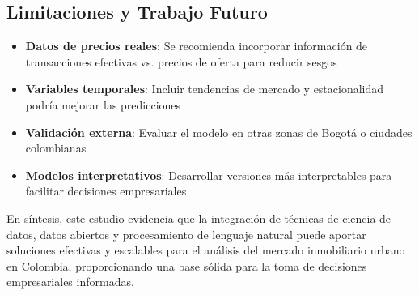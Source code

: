 \documentclass[12pt,a4paper,onecolumn]{article}
\begin{document}
\subsection{Limitaciones y Trabajo Futuro}

\begin{itemize}
\item \textbf{Datos de precios reales}: Se recomienda incorporar información de transacciones efectivas vs. precios de oferta para reducir sesgos
\item \textbf{Variables temporales}: Incluir tendencias de mercado y estacionalidad podría mejorar las predicciones
\item \textbf{Validación externa}: Evaluar el modelo en otras zonas de Bogotá o ciudades colombianas
\item \textbf{Modelos interpretativos}: Desarrollar versiones más interpretables para facilitar decisiones empresariales
\end{itemize}

En síntesis, este estudio evidencia que la integración de técnicas de ciencia de datos, datos abiertos y procesamiento de lenguaje natural puede aportar soluciones efectivas y escalables para el análisis del mercado inmobiliario urbano en Colombia, proporcionando una base sólida para la toma de decisiones empresariales informadas.


\pagebreak
\singlespacing
\nocite{*}

\end{document}
